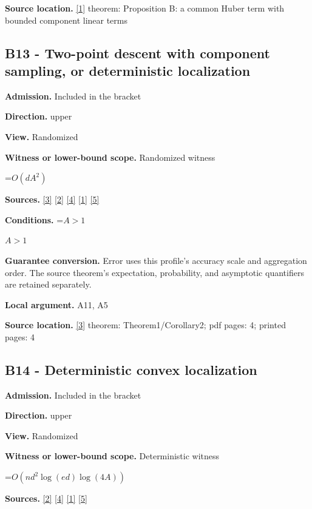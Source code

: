 \documentclass[10pt,a4paper]{article}
\newcommand{\AtlasMath}[1]{\par\begingroup\centering\setbox0=\hbox{$\displaystyle #1$}\ifdim\wd0>1.4\linewidth\typeout{ATLAS WIDE FORMULA: \the\wd0}\fi\ifdim\wd0>\linewidth\resizebox{\linewidth}{!}{\box0}\else\box0\fi\par\endgroup}
\newcommand{\AtlasInlineMath}[1]{\begingroup\setbox0=\hbox{$#1$}\ifdim\wd0>.4\linewidth\endgroup\AtlasMath{#1}\else\endgroup$#1$\fi}
\begin{document}
\textbf{Source location.} \href{https://arxiv.org/html/2610.00345v1}{[1]} theorem: Proposition B: a common Huber term with bounded component linear terms

\subsection{B13 - Two-point descent with component sampling, or deterministic localization}
\textbf{Admission.} Included in the bracket

\textbf{Direction.} upper

\textbf{View.} Randomized

\textbf{Witness or lower-bound scope.} Randomized witness

\AtlasMath{O(dA^2)}
\textbf{Sources.} \href{https://jmlr.org/papers/volume18/16-632/16-632.pdf}{[3]} \href{https://arxiv.org/html/2607.16558v2}{[2]} \href{https://www.mathnet.ru/php/archive.phtml?jrnid=mzm&option_lang=eng&paperid=1697&wshow=paper}{[4]} \href{https://arxiv.org/html/2610.00345v1}{[1]} \href{https://arxiv.org/abs/2109.08858}{[5]}

\textbf{Conditions.} \AtlasInlineMath{A>1}

\textbf{Guarantee conversion.} Error uses this profile's accuracy scale and aggregation order. The source theorem's expectation, probability, and asymptotic quantifiers are retained separately.

\textbf{Local argument.} A11, A5

\textbf{Source location.} \href{https://jmlr.org/papers/volume18/16-632/16-632.pdf}{[3]} theorem: Theorem1/Corollary2; pdf pages: 4; printed pages: 4

\subsection{B14 - Deterministic convex localization}
\textbf{Admission.} Included in the bracket

\textbf{Direction.} upper

\textbf{View.} Randomized

\textbf{Witness or lower-bound scope.} Deterministic witness

\AtlasMath{O(nd^2\log(ed)\log(4A))}
\textbf{Sources.} \href{https://arxiv.org/html/2607.16558v2}{[2]} \href{https://www.mathnet.ru/php/archive.phtml?jrnid=mzm&option_lang=eng&paperid=1697&wshow=paper}{[4]} \href{https://arxiv.org/html/2610.00345v1}{[1]} \href{https://arxiv.org/abs/2109.08858}{[5]}
\end{document}
